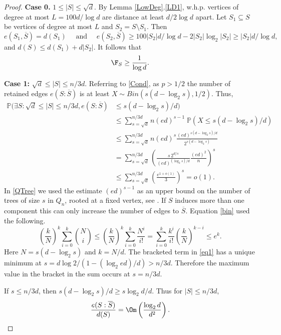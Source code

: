 \documentclass[12pt]{article}
\def\nn{\nonumber}
\newcommand{\ol}[1]{\overline{#1}}
\newcommand{\brac}[1]{\left(#1\right)}
\newcommand{\bfrac}[2]{\left(\frac{#1}{#2}\right)}
\def\sm{\setminus}
\def\seq{\subseteq}
\def\Pr{\mathbb{P}}
\def\nn{\nonumber}
\begin{document}
\begin{proof}
{\bf Case 0.} $1 \le |S| \le \sqrt d$. By Lemma \ref{LowDeg}.\ref{LD1},   w.h.p. vertices of degree at most $L=100 d/\log d$ are distance at least $d/2 \log d$ apart. Let $S_1 \seq S$ be vertices of degree at most $L$ and $S_2=S\sm S_1$.
Then
\[
e(S_1, \ol S)=d(S_1) \quad \text{ and }\quad e(S_2, \ol S) \ge 100|S_2| d/\log d- 2|S_2| \log_2 |S_2| \ge |S_2| d/\log d,
\]
and $d(S) \le d(S_1)+ d|S_2|$. It follows that
\begin{equation} \label{smalldeg}
\F_S \ge \frac{1}{\log d}.
\end{equation}

{\bf Case 1:} $\sqrt d\leq |S|\leq n/3d$.
Referring to \eqref{Cond}, as $p>1/2$ the number of retained edges $e(S:\ol S)$ is at least
 $X \sim Bin(s(d-\log_2s),1/2)$. Thus,
\begin{align}
\Pr(\exists S: \sqrt d \le |S|\leq n/3d, e(S:\ol S)&\leq s(d-\log_2s)/d) \nn\\
&\leq\sum_{s=\sqrt d}^{n/3d}   n(ed)^{s-1} \;\Pr(X\leq s(d-\log_2s)/d)\label{QTree}\\
&\leq \sum_{s=\sqrt d}^{n/3d}n(ed)^s\frac{(ed)^{s(d-\log_2s)/d}}{2^{s(d-\log_2s)}}\label{bin}\\
&= \sum_{s=\sqrt d}^{n/3d} \brac{\frac{s \,2^{d/s} }{(ed)^{(\log_2s)/d}} \frac{(ed)^2}{n}}^{s} \label{eq1}\\
 &\le \sum_{s=\sqrt d}^{n/3d}  \bfrac{e^{1+o(1)}}{3}^s= o(1) . \nn
\end{align}
In \eqref{QTree} we used  the estimate $(ed)^{s-1}$ as an upper bound on the number of trees  of size $s$ in $Q_n$, rooted at a fixed vertex, see \cite{BFMcD}. If $S$ induces more than one component this can only increase the number of edges to $\overline S$.
Equation \eqref{bin} used the following.
\begin{equation}\label{BinSum}
\bfrac{k}{N}^k\sum_{i=0}^k\binom{N}{i}\leq \bfrac{k}{N}^k\sum_{i=0}^k \frac{N^i}{i!}=\sum_{i=0}^k\frac{k^i}{i!}\bfrac{k}{N}^{k-i}\leq e^k.
\end{equation}
Here $N=s(d-\log_2s)$   and  $k=N/d$. The  bracketed term in \eqref{eq1} has a unique minimum at $s=d \log 2/(1-(\log_2ed)/d)>n/3d$. Therefore the maximum value in the bracket in the sum occurs at $s=n/3d$.

If $s\le n/3d$, then  $s(d-\log_2s)/d\geq s\log_2d/d$. Thus for $|S| \le n/3d$,
\begin{equation}\label{n/3d}
\frac{e(S:\ol S)}{d(S)}= \Om \bfrac{\log_2 d}{d^2}.
\end{equation}


\end{proof}
\end{document}
